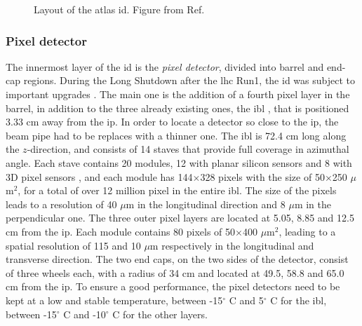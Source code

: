 \begin{figure}[ht]
\centering
{}
\caption{Layout of the \gls{atlas} \gls{id}. Figure from Ref. \cite{Potamianos:2016ptf}}
\label{fig:atlas:id}
\end{figure}


\subsubsection*{Pixel detector}
\label{sec:atlas:pixel}
The innermost layer of the \gls{id} is the \textit{pixel detector}, divided into barrel and end-cap regions. During the Long Shutdown after the \gls{lhc} Run1, the \gls{id} was subject to important upgrades \cite{Potamianos:2016ptf}. The main one is the addition of a fourth pixel layer in the barrel, in addition to the three already existing ones, the \gls{ibl} \cite{Capeans:1291633}, that is positioned 3.33 cm away from the \gls{ip}. In order to locate a detector so close to the \gls{ip}, the beam pipe had to be replaces with a thinner one. The \gls{ibl} is 72.4 cm long along the $z$-direction, and consists of 14 staves that provide full coverage in azimuthal angle. Each stave contains 20 modules, 12 with planar silicon sensors and 8 with 3D pixel sensors \cite{1748-0221-7-11-P11010}, and each module has 144$\times$328 pixels with the size of 50$\times$250 $\mu$m$^2$, for a total of over 12 million pixel in the entire \gls{ibl}. The size of the pixels leads to a resolution of 40 $\mu$m in the longitudinal direction and 8 $\mu$m in the perpendicular one. The three outer pixel layers are located at 5.05, 8.85 and 12.5 cm from the \gls{ip}. Each module contains 80 pixels of 50$\times$400 $\mu$m$^2$, leading to a spatial resolution of 115 and 10 $\mu$m respectively in the longitudinal and transverse direction. 
The two end caps, on the two sides of the detector, consist of three wheels each, with a radius of 34 cm and located at 49.5, 58.8 and 65.0 cm from the \gls{ip}. 
To ensure a good performance, the pixel detectors need to be kept at a low and stable temperature, between -15$^{\circ}$ C and 5$^{\circ}$ C for the \gls{ibl}, between -15$^{\circ}$ C and -10$^{\circ}$ C for the other layers.


